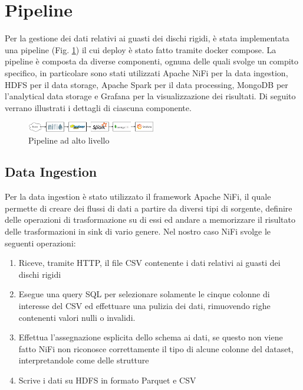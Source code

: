 \documentclass[conference]{IEEEtran}
\begin{document}
\section{Pipeline}
Per la gestione dei dati relativi ai guasti dei dischi rigidi, è stata implementata una pipeline (Fig. \ref{fig:pipeline}) il cui deploy è stato fatto tramite docker compose. La pipeline è composta da diverse componenti, ognuna delle quali svolge un compito specifico, in particolare sono stati utilizzati Apache NiFi per la data ingestion, HDFS per il data storage, Apache Spark per il data processing, MongoDB per l'analytical data storage e Grafana per la visualizzazione dei risultati. Di seguito verrano illustrati i dettagli di ciascuna componente.
\begin{figure}[H]
    \centering
    \includegraphics[width=0.5\textwidth]{./res/pipeline.png}
    \caption{Pipeline ad alto livello}
    \label{fig:pipeline}
\end{figure} 
\subsection{Data Ingestion}
Per la data ingestion è stato utilizzato il framework Apache NiFi, il quale permette di creare dei flussi di dati a partire da diversi tipi di sorgente, definire delle operazioni di trasformazione su di essi ed andare a memorizzare il risultato delle trasformazioni in sink di vario genere. Nel nostro caso NiFi svolge le seguenti operazioni:
\begin{enumerate}
    \item Riceve, tramite HTTP, il file CSV contenente i dati relativi ai guasti dei dischi rigidi
    \item Esegue una query SQL %
    per selezionare solamente le cinque colonne di interesse del CSV ed effettuare una pulizia dei dati, rimuovendo righe contenenti valori nulli o invalidi. 
    \item Effettua l'assegnazione esplicita dello schema ai dati, se questo non viene fatto NiFi non riconosce correttamente il tipo di alcune colonne del dataset, interpretandole come delle strutture
    \item Scrive i dati su HDFS in formato Parquet e CSV
\end{enumerate}
\end{document}
